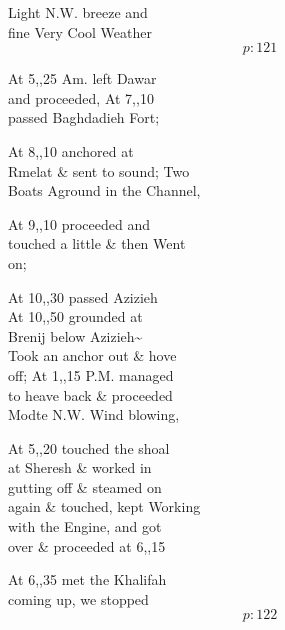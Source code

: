 \documentclass{report}
\begin{document}
	\par{
 	Light N.W. breeze and\ \\fine Very Cool Weather\ \\
  \[p: 121 \]

	}


	\par{
 	At 5,,25 Am. left Dawar\ \\and proceeded, At 7,,10\ \\passed Baghdadieh Fort;\ \\
	}

	\par{
 	At 8,,10 anchored at\ \\Rmelat \& sent to sound; Two\ \\Boats Aground in the Channel,\ \\
	}

	\par{
 	At 9,,10 proceeded and\ \\touched a little \& then Went\ \\on;\ \\
	}

	\par{
 	At 10,,30 passed Azizieh\ \\At 10,,50 grounded at\ \\Brenij below Azizieh\~{}\ \\Took an anchor out \& hove\ \\off; At 1,,15 P.M. managed\ \\to heave back \& proceeded\ \\Modte N.W. Wind blowing,\ \\
	}

	\par{
 	At 5,,20 touched the shoal\ \\at Sheresh \& worked in\ \\gutting off \& steamed on\ \\again \& touched, kept Working\ \\with the Engine, and got\ \\over \& proceeded at 6,,15\ \\
	}

	\par{
 	At 6,,35 met the Khalifah\ \\coming up, we stopped\ \\
  \[p: 122 \]

	}

\end{document}
